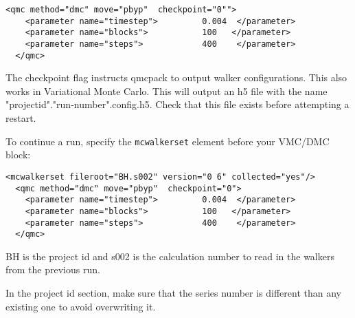 \begin{itemize}
\begin{lstlisting}[caption=The following is an example of running a simulation that can be restarted . ]
  <qmc method="dmc" move="pbyp"  checkpoint="0"">
    <parameter name="timestep">         0.004  </parameter>
    <parameter name="blocks">           100   </parameter>
    <parameter name="steps">            400    </parameter>
  </qmc>
\end{lstlisting}

The checkpoint flag instructs qmcpack to output walker configurations.  This also
works in Variational Monte Carlo.  This will output an h5 file with the name "projectid"."run-number".config.h5.
Check that this file exists before attempting a restart.

To continue a run, specify the \texttt{mcwalkerset} element before your VMC/DMC block:
\begin{lstlisting}[caption=Restart (read walkers from previous run) ]
 <mcwalkerset fileroot="BH.s002" version="0 6" collected="yes"/>
  <qmc method="dmc" move="pbyp"  checkpoint="0">
    <parameter name="timestep">         0.004  </parameter>
    <parameter name="blocks">           100   </parameter>
    <parameter name="steps">            400    </parameter>
  </qmc>
\end{lstlisting}
BH is the project id and s002 is the calculation number to read in the walkers from the previous run.

In the project id section, make sure that the series number is different than any existing one to avoid overwriting it. 

\end{itemize}
